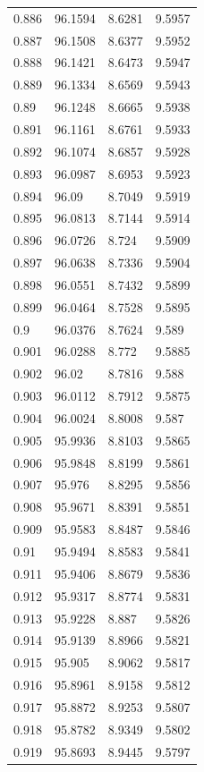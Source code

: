 \begin{tabular}{llll}
0.886 & 96.1594 & 8.6281 & 9.5957 \\
0.887 & 96.1508 & 8.6377 & 9.5952 \\
0.888 & 96.1421 & 8.6473 & 9.5947 \\
0.889 & 96.1334 & 8.6569 & 9.5943 \\
0.89 & 96.1248 & 8.6665 & 9.5938 \\
0.891 & 96.1161 & 8.6761 & 9.5933 \\
0.892 & 96.1074 & 8.6857 & 9.5928 \\
0.893 & 96.0987 & 8.6953 & 9.5923 \\
0.894 & 96.09 & 8.7049 & 9.5919 \\
0.895 & 96.0813 & 8.7144 & 9.5914 \\
0.896 & 96.0726 & 8.724 & 9.5909 \\
0.897 & 96.0638 & 8.7336 & 9.5904 \\
0.898 & 96.0551 & 8.7432 & 9.5899 \\
0.899 & 96.0464 & 8.7528 & 9.5895 \\
0.9 & 96.0376 & 8.7624 & 9.589 \\
0.901 & 96.0288 & 8.772 & 9.5885 \\
0.902 & 96.02 & 8.7816 & 9.588 \\
0.903 & 96.0112 & 8.7912 & 9.5875 \\
0.904 & 96.0024 & 8.8008 & 9.587 \\
0.905 & 95.9936 & 8.8103 & 9.5865 \\
0.906 & 95.9848 & 8.8199 & 9.5861 \\
0.907 & 95.976 & 8.8295 & 9.5856 \\
0.908 & 95.9671 & 8.8391 & 9.5851 \\
0.909 & 95.9583 & 8.8487 & 9.5846 \\
0.91 & 95.9494 & 8.8583 & 9.5841 \\
0.911 & 95.9406 & 8.8679 & 9.5836 \\
0.912 & 95.9317 & 8.8774 & 9.5831 \\
0.913 & 95.9228 & 8.887 & 9.5826 \\
0.914 & 95.9139 & 8.8966 & 9.5821 \\
0.915 & 95.905 & 8.9062 & 9.5817 \\
0.916 & 95.8961 & 8.9158 & 9.5812 \\
0.917 & 95.8872 & 8.9253 & 9.5807 \\
0.918 & 95.8782 & 8.9349 & 9.5802 \\
0.919 & 95.8693 & 8.9445 & 9.5797 \\

\end{tabular}
